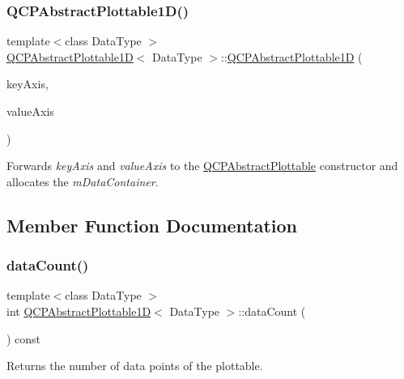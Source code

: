 \subsubsection{\texorpdfstring{Q\+C\+P\+Abstract\+Plottable1\+D()}{QCPAbstractPlottable1D()}}
{\footnotesize\ttfamily template$<$class Data\+Type $>$ \\
\mbox{\hyperlink{class_q_c_p_abstract_plottable1_d}{Q\+C\+P\+Abstract\+Plottable1D}}$<$ Data\+Type $>$\+::\mbox{\hyperlink{class_q_c_p_abstract_plottable1_d}{Q\+C\+P\+Abstract\+Plottable1D}} (\begin{DoxyParamCaption}\item[{\mbox{\hyperlink{class_q_c_p_axis}{Q\+C\+P\+Axis}} $\ast$}]{key\+Axis,  }\item[{\mbox{\hyperlink{class_q_c_p_axis}{Q\+C\+P\+Axis}} $\ast$}]{value\+Axis }\end{DoxyParamCaption})}

Forwards {\itshape key\+Axis} and {\itshape value\+Axis} to the \mbox{\hyperlink{class_q_c_p_abstract_plottable_af78a036e40db6f53a31abadc5323715a}{Q\+C\+P\+Abstract\+Plottable}} constructor and allocates the {\itshape m\+Data\+Container}. 

\subsection{Member Function Documentation}
\mbox{\label{class_q_c_p_abstract_plottable1_d_a354545da303458283df3f7948a7a768b}} 
\subsubsection{\texorpdfstring{data\+Count()}{dataCount()}}
{\footnotesize\ttfamily template$<$class Data\+Type $>$ \\
int \mbox{\hyperlink{class_q_c_p_abstract_plottable1_d}{Q\+C\+P\+Abstract\+Plottable1D}}$<$ Data\+Type $>$\+::data\+Count (\begin{DoxyParamCaption}{ }\end{DoxyParamCaption}) const\hspace{0.3cm}{\ttfamily [virtual]}}





Returns the number of data points of the plottable. 

